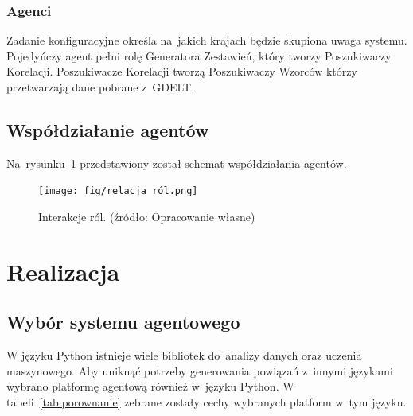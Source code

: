 \documentclass[11pt]{report}
\begin{document}
    \subsection{Agenci}
    Zadanie konfiguracyjne określa na~jakich krajach będzie skupiona uwaga systemu.
    Pojedyńczy agent pełni rolę Generatora Zestawień, który tworzy Poszukiwaczy Korelacji.
    Poszukiwacze Korelacji tworzą Poszukiwaczy Wzorców którzy przetwarzają dane pobrane z~GDELT\@.


    \section{Współdziałanie agentów}
    Na~rysunku~\ref{fig:relacje} przedstawiony został schemat współdziałania agentów.

    \begin{figure}[!ht]
        \centering
        \texttt{[image: fig/relacja ról.png]}
        \caption{Interakcje ról. (źródło: Opracowanie własne)}
        \label{fig:relacje}
    \end{figure}


    \chapter{Realizacja}\label{ch:realizacja}


    \section{Wybór systemu agentowego}

    W języku Python istnieje wiele bibliotek do~analizy danych oraz uczenia maszynowego.
    Aby uniknąć potrzeby generowania powiązań z~innymi językami wybrano platformę agentową również w~języku Python.
    W tabeli~\ref{tab:porownanie} zebrane zostały cechy wybranych platform w~tym języku.
\end{document}

